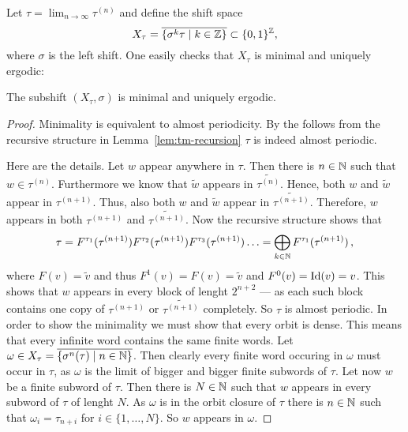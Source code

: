 Let $\tau=\lim_{n\to\infty}\tau^{(n)}$ and define the shift space
\[
X_\tau = \overline{\{\sigma^k \tau\mid k\in\mathbb{Z}\}}\subset\{0,1\}^{\mathbb{Z}},
\]
where $\sigma$ is the left shift.
One easily checks that $X_\tau$ is minimal and uniquely ergodic:
\begin{lemma}\label{lem:tm-ergodic}
The subshift $(X_\tau,\sigma)$ is minimal and uniquely ergodic.
\end{lemma}
\begin{proof}
	Minimality is equivalent to almost periodicity.
	By the follows from the recursive structure in Lemma~\ref{lem:tm-recursion} $\tau$ is indeed almost periodic.

	Here are the details.
	Let $w$ appear anywhere in $\tau$.
	Then there is $n \in \mathbb{N}$ such that $w \in \tau^{(n)}$.
	Furthermore we know that $\widetilde{w}$ appears in $\widetilde{\tau^{(n)}}$.
	Hence, both $w$ and $\widetilde{w}$ appear in $\tau^{(n+1)}$.
	Thus, also both $w$ and $\widetilde{w}$ appear in $\widetilde{\tau^{(n+1)}}$.
	Therefore, $w$ appears in both $\tau^{(n+1)}$ and $\widetilde{\tau^{(n+1)}}$.
	Now the recursive structure shows that
	\[ \tau = F^{\tau_1}(\tau^{(n+1)})F^{\tau_2}(\tau^{(n+1)})F^{\tau_3}(\tau^{(n+1)}) \ldots = \bigoplus_{k \in \mathbb{N}} F^{\tau_1}(\tau^{(n+1)} ) \,,\]
	where $F(v) = \widetilde{v}$ and thus $F^1(v) = F(v) = \widetilde{v}$ and $F^0(v) = \operatorname{Id}(v) = v$.
	This shows that $w$ appears in every block of lenght $2^{n+2}$ --- as each such block contains one copy of $\tau^{(n+1)}$ or $\widetilde{\tau^{(n+1)}}$ completely.
	So $\tau$ is almost periodic.
	In order to show the minimality we must show that every orbit is dense.
	This means that every infinite word contains the same finite words.
	Let $\omega \in X_\tau = \overline{\{ \sigma^n(\tau) \; \vert \; n \in \mathbb{N} \}}$.
	Then clearly every finite word occuring in $\omega$ must occur in $\tau$,
	as $\omega$ is the limit of bigger and bigger finite subwords of $\tau$.
	Let now $w$ be a finite subword of $\tau$.
	Then there is $N \in \mathbb{N}$ such that $w$ appears in every subword of $\tau$ of lenght $N$.
	As $\omega$ is in the orbit closure of $\tau$ there is $n \in \mathbb{N}$ such that
	$\omega_i = \tau_{n+i}$ for $i \in \{ 1,\ldots,N\}$.
	So $w$ appears in $\omega$. 


\end{proof}
